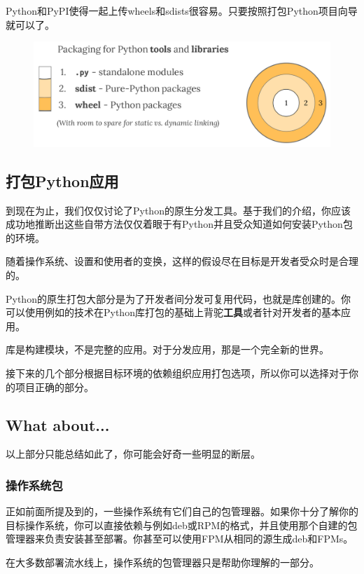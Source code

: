 \documentclass[../package_tutorial.tex]{subfiles}
\begin{document}
Python和PyPI使得一起上传wheels和sdists很容易。只要按照打包Python项目向导就可以了。

\begin{figure}[h]
    \centering
    \includegraphics[width=.8\textwidth]{../images/py_pkg_tools_and_libs.png}
\end{figure}

\subsection{打包Python应用}

到现在为止，我们仅仅讨论了Python的原生分发工具。基于我们的介绍，你应该成功地推断出这些自带方法仅仅着眼于有Python并且受众知道如何安装Python包的环境。

随着操作系统、设置和使用者的变换，这样的假设尽在目标是开发者受众时是合理的。

Python的原生打包大部分是为了开发者间分发可复用代码，也就是库创建的。你可以使用例如的技术在Python库打包的基础上背驼\textbf{工具}或者针对开发者的基本应用。

库是构建模块，不是完整的应用。对于分发应用，那是一个完全新的世界。

接下来的几个部分根据目标环境的依赖组织应用打包选项，所以你可以选择对于你的项目正确的部分。

\subsection{What about...}

以上部分只能总结如此了，你可能会好奇一些明显的断层。

\subsubsection{操作系统包}

正如前面所提及到的，一些操作系统有它们自己的包管理器。如果你十分了解你的目标操作系统，你可以直接依赖与例如deb或RPM的格式，并且使用那个自建的包管理器来负责安装甚至部署。你甚至可以使用FPM从相同的源生成deb和FPMs。

在大多数部署流水线上，操作系统的包管理器只是帮助你理解的一部分。
\end{document}

